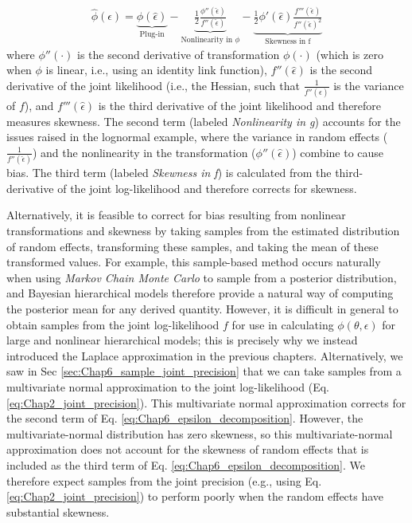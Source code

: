 \begin{equation} \label{eq:Chap6_epsilon_decomposition}
\begin{gathered}
    \hat{\phi}(\epsilon) = \underbrace{\phi(\hat \epsilon)}_{\text{Plug-in}} - \underbrace{\frac{1}{2} \frac{\phi''(\hat \epsilon)}{f''(\hat \epsilon)}}_{\text{Nonlinearity in }\phi} - \underbrace{\frac{1}{2}  \phi'(\hat \epsilon)  \frac{f'''(\hat \epsilon)}{f''(\hat \epsilon)^2}}_{\text{Skewness in f}}
\end{gathered}
\end{equation}
where \(\phi''(\cdot)\) is the second derivative of transformation \(\phi(\cdot)\) (which is zero when \(\phi\) is linear, i.e., using an identity link function), \(f''(\hat \epsilon)\) is the second derivative of the joint likelihood (i.e., the Hessian, such that \(\frac{1}{f''(\hat \epsilon)}\) is the variance of \(f\)), and \(f'''(\hat \epsilon)\) is the third derivative of the joint likelihood and therefore measures skewness.  The second term (labeled \textit{Nonlinearity in g}) accounts for the issues raised in the lognormal example, where the variance in random effects (\(\frac{1}{f''(\hat \epsilon)}\)) and the nonlinearity in the transformation (\(\phi''(\hat \epsilon)\)) combine to cause bias.  The third term (labeled \textit{Skewness in f}) is calculated from the third-derivative of the joint log-likelihood and therefore corrects for skewness.  

Alternatively, it is feasible to correct for bias resulting from nonlinear transformations and skewness by taking samples from the estimated distribution of random effects, transforming these samples, and taking the mean of these transformed values.  For example, this sample-based method occurs naturally when using \textit{Markov Chain Monte Carlo} to sample from a posterior distribution, and Bayesian hierarchical models therefore provide a natural way of computing the posterior mean for any derived quantity.  However, it is difficult in general to obtain samples from the joint log-likelihood \(f\) for use in calculating \( \phi(\theta,\epsilon) \) for large and nonlinear hierarchical models; this is precisely why we instead introduced the Laplace approximation in the previous chapters.  Alternatively, we saw in Sec \ref{sec:Chap6_sample_joint_precision} that we can take samples from a multivariate normal approximation to the joint log-likelihood (Eq. \ref{eq:Chap2_joint_precision}).  This multivariate normal approximation corrects for the second term of Eq. \ref{eq:Chap6_epsilon_decomposition}.  However, the multivariate-normal distribution has zero skewness, so this multivariate-normal approximation does not account for the skewness of random effects that is included as the third term of Eq. \ref{eq:Chap6_epsilon_decomposition}.  We therefore expect samples from the joint precision (e.g., using Eq. \ref{eq:Chap2_joint_precision}) to perform poorly when the random effects have substantial skewness.  

